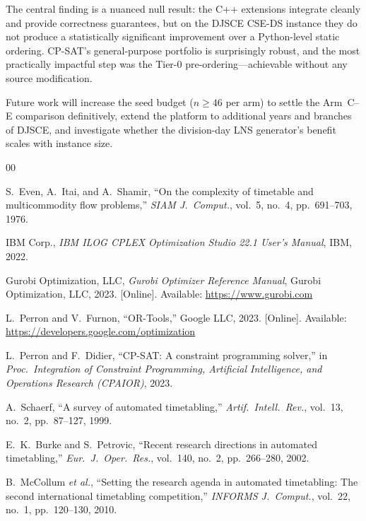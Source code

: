\documentclass[conference]{IEEEtran}
\begin{document}
The central finding is a nuanced null result: the C++ extensions integrate
cleanly and provide correctness guarantees, but on the DJSCE CSE-DS instance
they do not produce a statistically significant improvement over a
Python-level static ordering. CP-SAT's general-purpose portfolio is
surprisingly robust, and the most practically impactful step was the
Tier-0 pre-ordering---achievable without any source modification.

Future work will increase the seed budget ($n{\ge}46$ per arm) to settle
the Arm~C--E comparison definitively, extend the platform to additional
years and branches of DJSCE, and investigate whether the division-day LNS
generator's benefit scales with instance size.

\begin{thebibliography}{00}

S.~Even, A.~Itai, and A.~Shamir, ``On the complexity of timetable and
multicommodity flow problems,'' \textit{SIAM J.\ Comput.}, vol.~5, no.~4,
pp.~691--703, 1976.

IBM Corp., \textit{IBM ILOG CPLEX Optimization Studio 22.1 User's Manual},
IBM, 2022.

Gurobi Optimization, LLC, \textit{Gurobi Optimizer Reference Manual},
Gurobi Optimization, LLC, 2023. [Online]. Available: \url{https://www.gurobi.com}

L.~Perron and V.~Furnon, ``OR-Tools,'' Google LLC, 2023. [Online]. Available:
\url{https://developers.google.com/optimization}

L.~Perron and F.~Didier, ``CP-SAT: A constraint programming solver,''
in \textit{Proc.\ Integration of Constraint Programming, Artificial Intelligence,
and Operations Research (CPAIOR)}, 2023.

A.~Schaerf, ``A survey of automated timetabling,''
\textit{Artif.\ Intell.\ Rev.}, vol.~13, no.~2, pp.~87--127, 1999.

E.~K.~Burke and S.~Petrovic, ``Recent research directions in automated
timetabling,'' \textit{Eur.\ J.\ Oper.\ Res.}, vol.~140, no.~2,
pp.~266--280, 2002.

B.~McCollum \textit{et al.}, ``Setting the research agenda in automated
timetabling: The second international timetabling competition,''
\textit{INFORMS J.\ Comput.}, vol.~22, no.~1, pp.~120--130, 2010.


\end{thebibliography}
\end{document}
